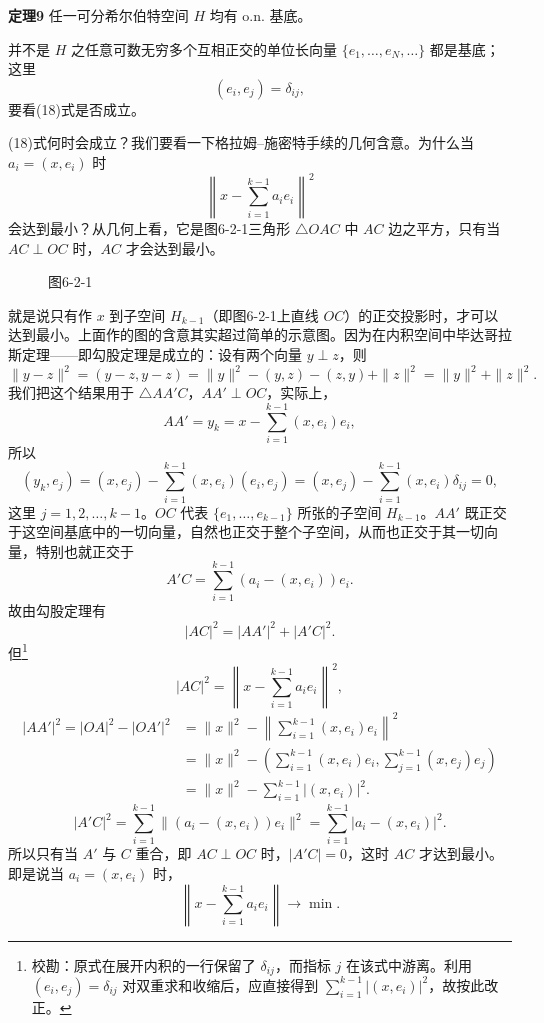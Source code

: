 \noindent\textbf{定理9}\quad
任一可分希尔伯特空间 $H$ 均有 o.n. 基底。

并不是 $H$ 之任意可数无穷多个互相正交的单位长向量 $\{e_1,\ldots,e_N,\ldots\}$ 都是基底；这里
\[
 (e_i,e_j)=\delta_{ij},
\]
要看(18)式是否成立。

(18)式何时会成立？我们要看一下格拉姆--施密特手续的几何含意。为什么当 $a_i=(x,e_i)$ 时
\[
 \left\|x-\sum_{i=1}^{k-1}a_i e_i\right\|^2
\]
会达到最小？从几何上看，它是图6-2-1三角形 $\triangle OAC$ 中 $AC$ 边之平方，只有当 $AC\perp OC$ 时，$AC$ 才会达到最小。

\begin{figure}[htbp]
\centering
{}
\caption{图6-2-1}
\end{figure}
就是说只有作 $x$ 到子空间 $H_{k-1}$（即图6-2-1上直线 $OC$）的正交投影时，才可以达到最小。上面作的图的含意其实超过简单的示意图。因为在内积空间中毕达哥拉斯定理——即勾股定理是成立的：设有两个向量 $y\perp z$，则
\[
 \|y-z\|^2=(y-z,y-z)=\|y\|^2-(y,z)-(z,y)+\|z\|^2=\|y\|^2+\|z\|^2.
\]
我们把这个结果用于 $\triangle AA'C$，$AA'\perp OC$，实际上，
\[
 AA'=y_k=x-\sum_{i=1}^{k-1}(x,e_i)e_i,
\]
所以
\[
 (y_k,e_j)=(x,e_j)-\sum_{i=1}^{k-1}(x,e_i)(e_i,e_j)
 =(x,e_j)-\sum_{i=1}^{k-1}(x,e_i)\delta_{ij}=0,
\]
这里 $j=1,2,\ldots,k-1$。$OC$ 代表 $\{e_1,\ldots,e_{k-1}\}$ 所张的子空间 $H_{k-1}$。$AA'$ 既正交于这空间基底中的一切向量，自然也正交于整个子空间，从而也正交于其一切向量，特别也就正交于
\[
 A'C=\sum_{i=1}^{k-1}(a_i-(x,e_i))e_i.
\]
故由勾股定理有
\[
 |AC|^2=|AA'|^2+|A'C|^2.
\]
但\footnote{校勘：原式在展开内积的一行保留了 $\delta_{ij}$，而指标 $j$ 在该式中游离。利用 $(e_i,e_j)=\delta_{ij}$ 对双重求和收缩后，应直接得到 $\sum_{i=1}^{k-1}|(x,e_i)|^2$，故按此改正。}
\[
 |AC|^2=\left\|x-\sum_{i=1}^{k-1}a_i e_i\right\|^2,
\]
\[
 \begin{aligned}
 |AA'|^2=|OA|^2-|OA'|^2
 &=\|x\|^2-\left\|\sum_{i=1}^{k-1}(x,e_i)e_i\right\|^2\\
 &=\|x\|^2-
 \left(\sum_{i=1}^{k-1}(x,e_i)e_i,
       \sum_{j=1}^{k-1}(x,e_j)e_j\right)\\
 &=\|x\|^2-\sum_{i=1}^{k-1}|(x,e_i)|^2.
 \end{aligned}
\]
\begin{equation}
 |A'C|^2=\sum_{i=1}^{k-1}\|(a_i-(x,e_i))e_i\|^2
 =\sum_{i=1}^{k-1}|a_i-(x,e_i)|^2.
 \tag{20}
\end{equation}
所以只有当 $A'$ 与 $C$ 重合，即 $AC\perp OC$ 时，$|A'C|=0$，这时 $AC$ 才达到最小。即是说当 $a_i=(x,e_i)$ 时，
\[
 \left\|x-\sum_{i=1}^{k-1}a_i e_i\right\|\to\min.
\]

